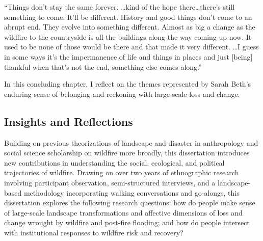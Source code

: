 \documentclass[
]{article}
\begin{document}
``Things don't stay the same forever. \ldots kind of the hope there\ldots there's still something to come. It'll be different. History and good things don't come to an abrupt end. They evolve into something different. Almost as big a change as the wildfire to the countryside is all the buildings along the way coming up now. It used to be none of those would be there and that made it very different. \ldots I guess in some ways it's the impermanence of life and things in places and just {[}being{]} thankful when that's not the end, something else comes along.''

In this concluding chapter, I reflect on the themes represented by Sarah Beth's enduring sense of belonging and reckoning with large-scale loss and change.

\subsection{Insights and Reflections}\label{insights-and-reflections}

Building on previous theorizations of landscape and disaster in anthropology and social science scholarship on wildfire more broadly, this dissertation introduces new contributions in understanding the social, ecological, and political trajectories of wildfire. Drawing on over two years of ethnographic research involving participant observation, semi-structured interviews, and a landscape-based methodology incorporating walking conversations and go-alongs, this dissertation explores the following research questions: how do people make sense of large-scale landscape transformations and affective dimensions of loss and change wrought by wildfire and post-fire flooding; and how do people intersect with institutional responses to wildfire risk and recovery?
\end{document}
